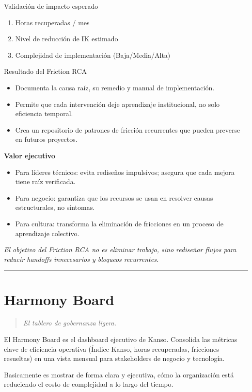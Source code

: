 Validación de impacto esperado
\begin{enumerate}
    \item Horas recuperadas / mes
    \item Nivel de reducción de IK estimado
    \item Complejidad de implementación (Baja/Media/Alta)
\end{enumerate}

Resultado del Friction RCA
\begin{itemize}
    \item Documenta la causa raíz, su remedio y manual de implementación.
    \item Permite que cada intervención deje aprendizaje institucional, no solo eficiencia temporal.
    \item Crea un repositorio de patrones de fricción recurrentes que pueden preverse en futuros proyectos.
\end{itemize}

\textbf{Valor ejecutivo}
\begin{itemize}
    \item Para líderes técnicos: evita rediseños impulsivos; asegura que cada mejora tiene raíz verificada.
    \item Para negocio: garantiza que los recursos se usan en resolver causas estructurales, no síntomas.
    \item Para cultura: transforma la eliminación de fricciones en un proceso de aprendizaje colectivo.
\end{itemize}

{\epigraph{\textit{El objetivo del Friction RCA no es eliminar trabajo, sino rediseñar flujos para reducir handoffs innecesarios y bloqueos recurrentes.}}{}}

\hrule
\section{Harmony Board}
\begin{quote}
\textit{El tablero de gobernanza ligera.}
\end{quote}

El Harmony Board es el dashboard ejecutivo de Kanso. Consolida las métricas clave de eficiencia operativa (Índice Kanso, horas recuperadas, fricciones resueltas) en una vista mensual para stakeholders de negocio y tecnología.

Basicamente es mostrar de forma clara y ejecutiva, cómo la organización está reduciendo el costo de complejidad a lo largo del tiempo.

